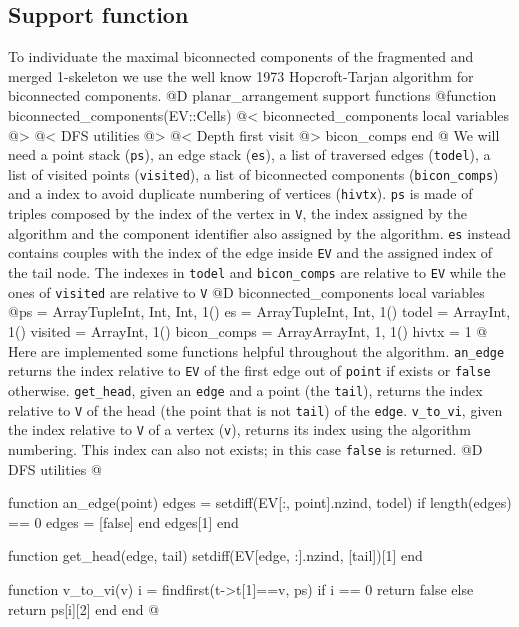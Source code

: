 \subsection{Support function}
\label{sec:biconnected_components}
To individuate the maximal biconnected components of the fragmented and merged 1-skeleton
we use the well know 1973 Hopcroft-Tarjan algorithm for biconnected components\cite{Hopcroft-Tarjan}.
@D planar\_arrangement support functions
@{function biconnected_components(EV::Cells)
    @< biconnected\_components local variables @>
    @< DFS utilities @>
    @< Depth first visit @>
    bicon_comps
end
@}
We will need a point stack (\texttt{ps}), an edge stack (\texttt{es}), a list of traversed edges (\texttt{todel}), a list of 
visited points (\texttt{visited}), a list of biconnected components (\texttt{bicon\_comps}) and a index to avoid duplicate 
numbering of vertices (\texttt{hivtx}). \texttt{ps} is made of triples composed by the index of the vertex in \texttt{V}, 
the index assigned by the algorithm and the component identifier also assigned by the algorithm. \texttt{es} instead 
contains couples with the index of the edge inside \texttt{EV} and the assigned index of the tail node. The indexes 
in \texttt{todel} and \texttt{bicon\_comps} are relative to \texttt{EV} while the ones of \texttt{visited} are
relative to \texttt{V}
@D biconnected\_components local variables
@{ps = Array{Tuple{Int, Int, Int}, 1}()
es = Array{Tuple{Int, Int}, 1}()
todel = Array{Int, 1}()
visited = Array{Int, 1}()
bicon_comps = Array{Array{Int, 1}, 1}()
hivtx = 1
@}
Here are implemented some functions helpful throughout the algorithm.
\texttt{an\_edge} returns the index relative to \texttt{EV} of the first edge out of \texttt{point} if exists or 
\texttt{false} otherwise. \texttt{get\_head}, given an \texttt{edge} and a point (the \texttt{tail}), returns the 
index relative to \texttt{V} of the head (the point that is not \texttt{tail}) of the \texttt{edge}. 
\texttt{v\_to\_vi}, given the index relative to \texttt{V} of a vertex (\texttt{v}), returns its index using 
the algorithm numbering. This index can also not exists; in this case \texttt{false} is returned.
@D DFS utilities
@{function an_edge(point)
    edges = setdiff(EV[:, point].nzind, todel)
    if length(edges) == 0
        edges = [false]
    end
    edges[1]
end

function get_head(edge, tail)
    setdiff(EV[edge, :].nzind, [tail])[1]
end

function v_to_vi(v)
    i = findfirst(t->t[1]==v, ps)
    if i == 0
        return false
    else
        return ps[i][2]
    end
end
@}
